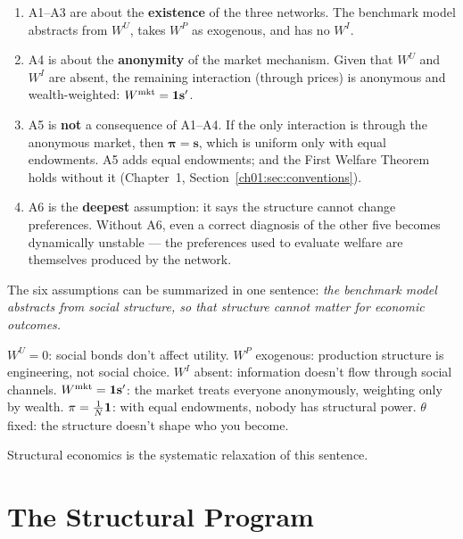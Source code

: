 \documentclass[../structural_economics_book.tex]{subfiles}
\begin{document}
\begin{remark}\label{ch04:prop:hierarchy}
\begin{enumerate}
\item A1--A3 are about the \textbf{existence} of the three networks. The benchmark model abstracts from $W^U$, takes $W^P$ as exogenous, and has no $W^I$.
\item A4 is about the \textbf{anonymity} of the market mechanism. Given that $W^U$ and $W^I$ are absent, the remaining interaction (through prices) is anonymous and wealth-weighted: $W^{\text{mkt}} = \mathbf{1}\mathbf{s}'$.
\item A5 is \textbf{not} a consequence of A1--A4. If the only interaction is through the anonymous market, then $\boldsymbol{\pi} = \mathbf{s}$, which is uniform only with equal endowments. A5 adds equal endowments; and the First Welfare Theorem holds without it (Chapter~1, Section~\ref{ch01:sec:conventions}).
\item A6 is the \textbf{deepest} assumption: it says the structure cannot change preferences. Without A6, even a correct diagnosis of the other five becomes dynamically unstable --- the preferences used to evaluate welfare are themselves produced by the network.
\end{enumerate}
\end{remark}

\begin{keyinsight}
The six assumptions can be summarized in one sentence: \textit{the benchmark model abstracts from social structure, so that structure cannot matter for economic outcomes.}

$W^U = 0$: social bonds don't affect utility. $W^P$ exogenous: production structure is engineering, not social choice. $W^I$ absent: information doesn't flow through social channels. $W^{\text{mkt}} = \mathbf{1}\mathbf{s}'$: the market treats everyone anonymously, weighting only by wealth. $\pi = \frac{1}{N}\mathbf{1}$: with equal endowments, nobody has structural power. $\theta$ fixed: the structure doesn't shape who you become.

Structural economics is the systematic relaxation of this sentence.
\end{keyinsight}


\section{The Structural Program}
\label{ch04:sec:program}
\end{document}
